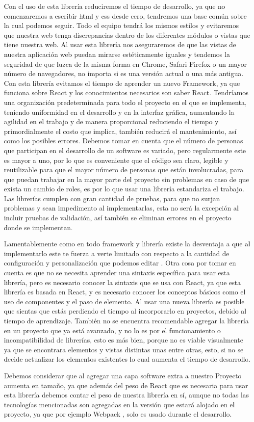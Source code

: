 Con el uso de esta librería reduciremos el tiempo de desarrollo, ya que no comenzaremos a escribir html y  css desde cero, tendremos una base común sobre la cual podemos seguir. Todo el equipo tendrá los mismos estilos y evitaremos que nuestra web tenga discrepancias dentro de los diferentes módulos o vistas que tiene nuestra web. 
Al usar esta librería nos aseguraremos de que las vistas de nuestra aplicación web puedan mirarse estéticamente iguales y tendemos la seguridad de que luzca de la misma forma en Chrome, Safari Firefox o un mayor número de navegadores, no importa si es una versión actual o una más antigua. 
Con esta librería evitamos el tiempo de aprender un nuevo Framework, ya que funciona sobre React y los conocimientos necesarios son saber React. 
Tendríamos una organización predeterminada para todo el proyecto en el que se implementa, teniendo uniformidad en el desarrollo y en la interfaz gráfica, aumentando la agilidad en el trabajo y de manera proporcional reduciendo el tiempo y primordialmente el costo que implica, también reducirá el mantenimiento, así como los posibles errores. 
Debemos tomar en cuenta que el número de personas que participan en el desarrollo de un software es variado, pero regularmente este es mayor a uno, por lo que es conveniente que el código sea claro, legible y reutilizable para que el mayor número de personas que están involucradas, para que puedan trabajar en la mayor parte del proyecto sin problemas en caso de que exista un cambio de roles, es por lo que usar una librería estandariza el trabajo. 
Las librerías cumplen con gran cantidad de pruebas, para que no surjan problemas y sean impedimento al implementarlas, esta no será la excepción al incluir pruebas de validación, así también se eliminan errores en el proyecto donde se implementan. 
  
Lamentablemente como en todo framework y librería existe la desventaja a que al implementarlo este te fuerza a verte limitado con respecto a la cantidad de configuración y personalización que podemos editar \cite{newTech}. Otra cosa por tomar en cuenta es que no se necesita aprender una sintaxis específica para usar esta librería, pero es necesario conocer la sintaxis que se usa con React, ya que esta librería es basada en React, y es necesario conocer los conceptos básicos como el uso de componentes y el paso de elemento. Al usar una nueva librería es posible que sientas que estás perdiendo el tiempo al incorporarlo en proyectos, debido al tiempo de aprendizaje. También no se encuentra recomendable agregar la librería en un proyecto que ya está avanzado, y no lo es por el funcionamiento o incompatibilidad de librerías, esto es más bien, porque no es viable visualmente ya que se encontrara elementos y vistas distintas unas entre otras, esto, si no se decide actualizar los elementos existentes lo cual aumenta el tiempo de desarrollo.


Debemos considerar que al agregar una capa software extra a nuestro Proyecto aumenta en tamaño, ya que además del peso de React que es necesaria para usar esta librería debemos contar el peso de nuestra librería en sí, aunque no todas  las tecnologías  mencionadas son agregadas en la versión que estará alojado en el proyecto, ya que por ejemplo Webpack \cite{webPack}, solo es usado durante el desarrollo.
\newpage